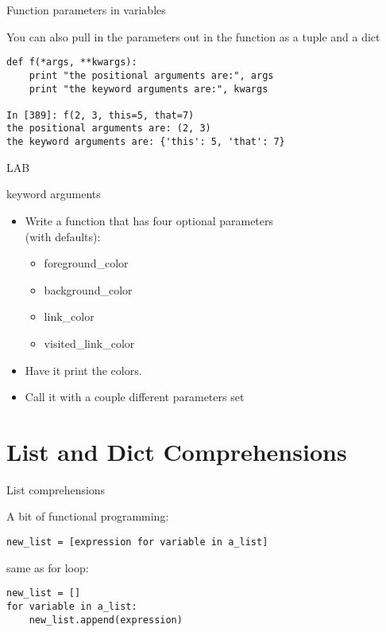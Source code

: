 \documentclass{beamer}
\begin{document}
\begin{frame}[fragile]{Function parameters in variables}

{\Large You can also pull in the parameters out in the function as a tuple and a dict
}
\begin{verbatim}
def f(*args, **kwargs):
    print "the positional arguments are:", args
    print "the keyword arguments are:", kwargs
 
In [389]: f(2, 3, this=5, that=7)
the positional arguments are: (2, 3)
the keyword arguments are: {'this': 5, 'that': 7}
\end{verbatim}

\end{frame} 

\begin{frame}{LAB}

{\Large keyword arguments}
\begin{itemize}
  \item Write a function that has four optional parameters\\
        (with defaults):
  \begin{itemize}
      \item foreground\_color
      \item background\_color
      \item link\_color
      \item visited\_link\_color
  \end{itemize}
  \item Have it print the colors.
  \item Call it with a couple different parameters set 
\end{itemize}

\end{frame}

\section{List and Dict Comprehensions}

\begin{frame}[fragile]{List comprehensions}

{\Large A bit of functional programming:}

\begin{verbatim}
new_list = [expression for variable in a_list]
\end{verbatim}

{\Large same as for loop:}

\begin{verbatim}
new_list = []
for variable in a_list:
    new_list.append(expression)
\end{verbatim}

\end{frame} 
\end{document}
